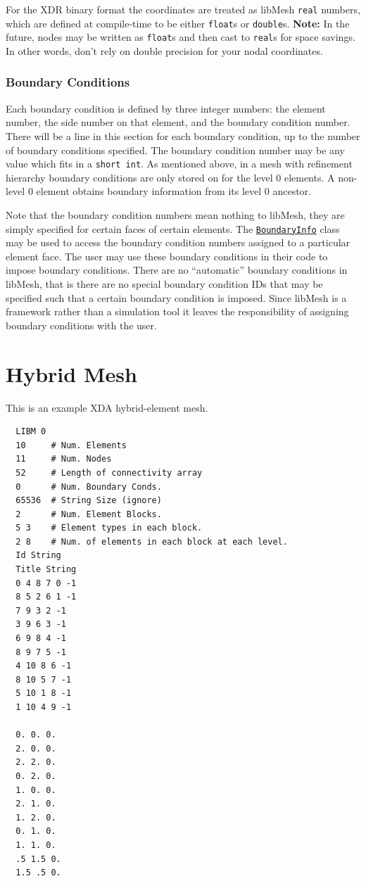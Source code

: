 \documentclass[12pt]{article}
\begin{document}
For the XDR binary format the coordinates are treated as libMesh \texttt{real} numbers, which are defined at compile-time to be either \texttt{float}s or \texttt{double}s.  \textbf{Note:} In the future, nodes may be written as \texttt{float}s and then cast to \texttt{real}s for space savings.  In other words, don't rely on double precision for your nodal coordinates.

\subsubsection{Boundary Conditions}
Each boundary condition is defined by three integer numbers:  the element number, the side number on that element, and the boundary condition number.  There will be a line in this section for each boundary condition, up to the number of boundary conditions specified.  The boundary condition number may be any value which fits in a \texttt{short int}. As mentioned above, in a mesh with refinement hierarchy boundary conditions are only stored on for the level 0 elements. A non-level 0 element obtains boundary information from its level 0 ancestor.

Note that the boundary condition numbers mean nothing to libMesh, they are simply specified for certain faces of certain elements.  The \href{http://libmesh.sourceforge.net/doxygen/classBoundaryInfo.html}{\texttt{BoundaryInfo}} class may be used to access the boundary condition numbers assigned to a particular element face.  The user may use these boundary conditions in their code to impose boundary conditions.  There are no ``automatic'' boundary conditions in libMesh, that is there are no special boundary condition IDs that may be specified such that a certain boundary condition is imposed.  Since libMesh is a framework rather than a simulation tool it leaves the responsibility of assigning boundary conditions with the user.

\clearpage
\appendix
\section{Hybrid Mesh}
This is an example XDA hybrid-element mesh.
\small
\begin{verbatim}
  LIBM 0
  10     # Num. Elements
  11     # Num. Nodes
  52     # Length of connectivity array
  0      # Num. Boundary Conds.
  65536  # String Size (ignore)
  2      # Num. Element Blocks.
  5 3    # Element types in each block.
  2 8    # Num. of elements in each block at each level.
  Id String
  Title String
  0 4 8 7 0 -1
  8 5 2 6 1 -1
  7 9 3 2 -1
  3 9 6 3 -1
  6 9 8 4 -1
  8 9 7 5 -1
  4 10 8 6 -1
  8 10 5 7 -1
  5 10 1 8 -1
  1 10 4 9 -1

  0. 0. 0.
  2. 0. 0.
  2. 2. 0.
  0. 2. 0.
  1. 0. 0.
  2. 1. 0.
  1. 2. 0.
  0. 1. 0.
  1. 1. 0.
  .5 1.5 0.
  1.5 .5 0.
\end{verbatim}
\normalsize
\end{document}
